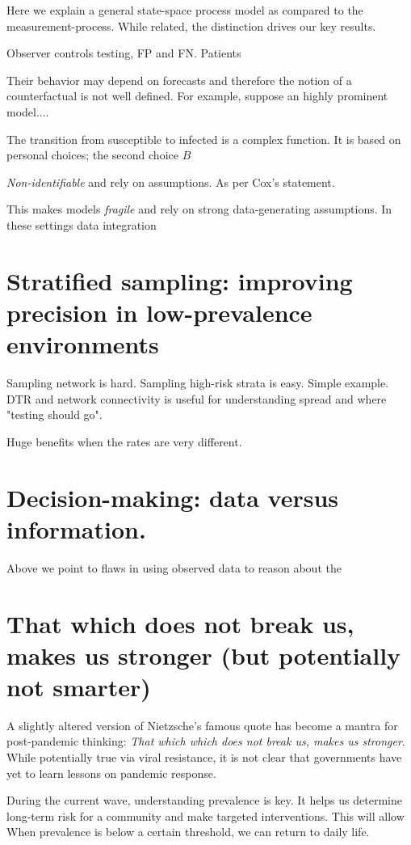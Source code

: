 \documentclass[11pt]{article}
\numberwithin{equation}{section}
\theoremstyle{plain}
\begin{document}
Here we explain a general state-space process model as compared to the measurement-process.  While related, the distinction drives our key results.

Observer controls testing, FP and FN.  Patients

Their behavior may depend on forecasts and therefore the notion of a counterfactual is not well defined.  For example, suppose an highly prominent model....

The transition from susceptible to infected is a complex function.  It is based on personal choices;  the second choice
$B$

\emph{Non-identifiable} and rely on assumptions.  As per Cox's statement.

This makes models \emph{fragile} and rely on strong data-generating assumptions.  In these settings data integration

\section{Stratified sampling: improving precision in low-prevalence environments}

Sampling network is hard.  Sampling high-risk strata is easy.  Simple example.
DTR and network connectivity is useful for understanding spread and where "testing should go".

Huge benefits when the rates are very different.

\section{Decision-making: data versus information.}

Above we point to flaws in using observed data to reason about the

\section{That which does not break us, makes us stronger (but potentially not smarter)}

A slightly altered version of Nietzsche's famous quote has become a mantra for post-pandemic thinking: \emph{That which which does not break us, makes us stronger}.  While potentially true via viral resistance, it is not clear that governments have yet to learn lessons on pandemic response.

During the current wave, understanding prevalence is key.  It helps us determine long-term risk for a community and make targeted interventions.  This will allow
When prevalence is below a certain threshold, we can return to daily life.
\end{document}
